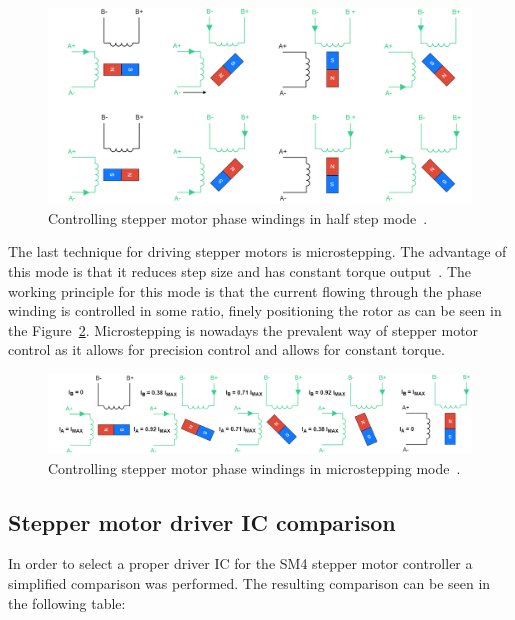 \begin{figure}[H]
    \centering
    \includegraphics[width=\textwidth]{obrazky/half_step_principle}
    \caption{Controlling stepper motor phase windings in half step mode~\cite{noauthor_stepper_nodate}.}
    \label{fig:stepper_half_step_mode}
\end{figure}

The last technique for driving stepper motors is microstepping.
The advantage of this mode is that it reduces step size and has constant torque output~\cite{noauthor_stepper_nodate}.
The working principle for this mode is that the current flowing through the phase winding is controlled in some ratio, finely positioning the rotor as can be seen in the Figure~\ref{fig:microstepping}.
Microstepping is nowadays the prevalent way of stepper motor control as it allows for precision control and allows for constant torque.

\begin{figure}[H]
    \centering
    \includegraphics[width=\textwidth]{obrazky/microstepping}
    \caption{Controlling stepper motor phase windings in microstepping mode~\cite{noauthor_stepper_nodate}.}
    \label{fig:microstepping}
\end{figure}


\subsection{Stepper motor driver IC comparison}
\label{subsec:stepper_ic}
In order to select a proper driver IC for the SM4 stepper motor controller a simplified comparison was performed.
The resulting comparison can be seen in the following table:

